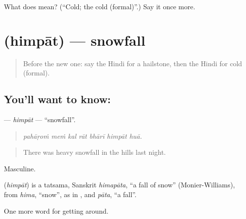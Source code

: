 \begin{tcolorbox}[breakable,colback=teal!4,colframe=teal!35!black,title={Before you move on}]
What does  mean? (\textquotedblleft{}Cold; the cold (formal)\textquotedblright{}.) Say it once more.
\end{tcolorbox}
\section[\texorpdfstring{\hi{हिमपात} (himpāt)}{हिमपात (himpāt)}]{ (himpāt) — snowfall}

\label{lesson:HI-C438-himpat}



\begin{quote}
Before the new one: say the Hindi for a hailstone, then the Hindi for cold (formal).
\end{quote}

\subsection*{You'll want to know: }
\textbf{} — \emph{himpāt} — \textquotedblleft{}snowfall\textquotedblright{}.

\begin{quote}
      
\end{quote}

\begin{quote}
\emph{pahāṛoṁ meṁ kal rāt bhārī himpāt huā.}
\end{quote}

\begin{quote}
There was heavy snowfall in the hills last night.
\end{quote}

Masculine.

\begin{cousinweb}
\textbf{} (\emph{himpāt}) is a tatsama, Sanskrit \emph{himapāta}, \textquotedblleft{}a fall of snow\textquotedblright{} (Monier-Williams), from \emph{hima}, \textquotedblleft{}snow\textquotedblright{}, as in , and \emph{pāta}, \textquotedblleft{}a fall\textquotedblright{}.
\end{cousinweb}

\begin{grammarlens}[title={What you've built}]
One more word for getting around.
\end{grammarlens}

